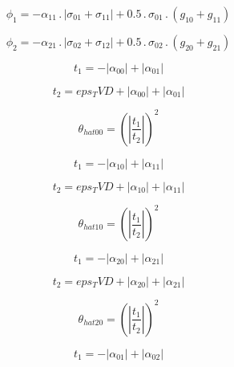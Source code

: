 \documentclass{article}
\begin{document}
\begin{dmath}\phi_{1} = - \alpha_{11} \,.\, \left|{\sigma_{0 1} + \sigma_{1 1}}\right| + 0.5 \,.\, \sigma_{0 1} \,.\, \left(g_{10} + g_{11}\right)\end{dmath}

\begin{dmath}\phi_{2} = - \alpha_{21} \,.\, \left|{\sigma_{0 2} + \sigma_{1 2}}\right| + 0.5 \,.\, \sigma_{0 2} \,.\, \left(g_{20} + g_{21}\right)\end{dmath}

\begin{dmath}t_{1} = - \left|{\alpha_{00}}\right| + \left|{\alpha_{01}}\right|\end{dmath}

\begin{dmath}t_{2} = eps_TVD + \left|{\alpha_{00}}\right| + \left|{\alpha_{01}}\right|\end{dmath}

\begin{dmath}\theta_{hat 00} = \left(\left|{\frac{t_{1}}{t_{2}}}\right| \right)^{2}\end{dmath}

\begin{dmath}t_{1} = - \left|{\alpha_{10}}\right| + \left|{\alpha_{11}}\right|\end{dmath}

\begin{dmath}t_{2} = eps_TVD + \left|{\alpha_{10}}\right| + \left|{\alpha_{11}}\right|\end{dmath}

\begin{dmath}\theta_{hat 10} = \left(\left|{\frac{t_{1}}{t_{2}}}\right| \right)^{2}\end{dmath}

\begin{dmath}t_{1} = - \left|{\alpha_{20}}\right| + \left|{\alpha_{21}}\right|\end{dmath}

\begin{dmath}t_{2} = eps_TVD + \left|{\alpha_{20}}\right| + \left|{\alpha_{21}}\right|\end{dmath}

\begin{dmath}\theta_{hat 20} = \left(\left|{\frac{t_{1}}{t_{2}}}\right| \right)^{2}\end{dmath}

\begin{dmath}t_{1} = - \left|{\alpha_{01}}\right| + \left|{\alpha_{02}}\right|\end{dmath}
\end{document}
